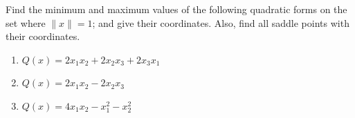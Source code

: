 \documentclass[12pt,letterpaper]{article}
\begin{document}
\begin{enumerate}
\newpage

    \Problem Find the minimum and maximum values of the following quadratic forms on the set where $\|x\| = 1$; and give their coordinates. Also, find all saddle points with their coordinates.
    \begin{enumerate}
        \item $Q(x) = 2x_1x_2 + 2x_2x_3 + 2x_3x_1$\vfill
        \item $Q(x) = 2x_1x_2 - 2x_2x_3$\vfill
        \item $Q(x) = 4x_1x_2 - x_1^2 - x_2^2$\vfill
    \end{enumerate}
\end{enumerate}

\end{document}
